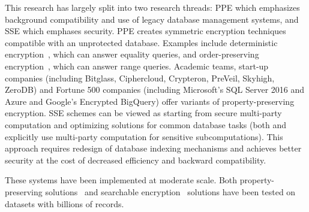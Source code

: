 This research has largely split into two research threads: PPE which
emphasizes background compatibility and use of legacy database
management systems, and SSE which emphases security.  PPE creates
symmetric encryption techniques
compatible with an unprotected database. Examples include deterministic
encryption~\cite{C:BelBolONe07}, which can answer equality queries, and
order-preserving encryption~\cite{C:BolCheONe11,EC:BCLO09},
which can answer range queries. Academic teams, start-up companies (including Bitglass, Ciphercloud, Crypteron, PreVeil, Skyhigh, ZeroDB) and Fortune
500 companies (including Microsoft's SQL Server 2016 and Azure and Google's Encrypted BigQuery)  offer variants of property-preserving encryption.
%
SSE schemes can be viewed as starting from secure multi-party
computation and
optimizing solutions for common database tasks (both \cite{SP:FVKKKM15} and \cite{RSA:IKLO16} explicitly use multi-party computation for sensitive subcomputations). This approach requires redesign
of database indexing mechanisms and achieves better security at the cost of decreased efficiency and backward compatibility. 

These systems have been implemented at moderate scale.  Both property-preserving solutions~\cite{CACM:PRZB12,EPRINT:PodBoePop16} and searchable encryption~\cite{SP:PKVKMC14,SP:FVKKKM15,C:CJJKRS13,CCS:JJKRS13,NDSS:CJJJKR14,ESORICS:FJKNRS15,RSA:IKLO16} solutions have been tested on datasets with billions of records.

%


